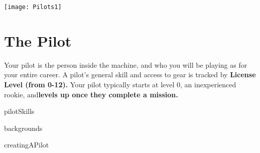 \newpage
\begin{center}
    \texttt{[image: Pilots1]}
\end{center}

\chapter{The Pilot}

Your pilot is the person inside the machine, and who you will be playing as for your entire career.
A pilot’s general skill and access to gear is tracked by \textbf{License Level (from 0-12).} Your pilot
typically starts at level 0, an inexperienced rookie, and\textbf{levels up once they complete a mission.} 


{pilotSkills}

{backgrounds}

{creatingAPilot}